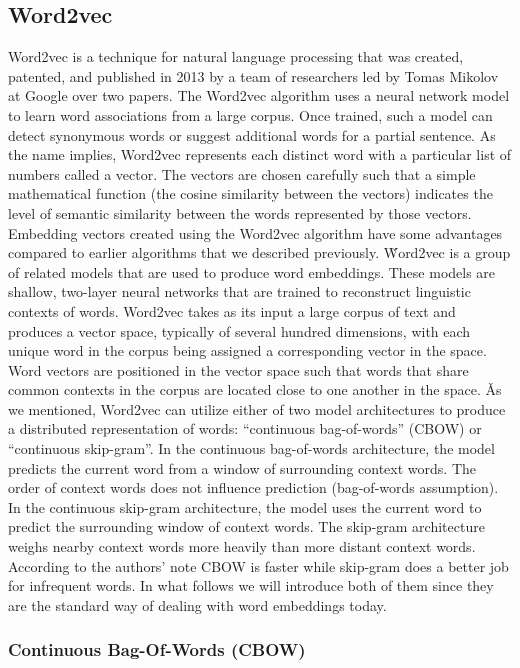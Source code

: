 \subsection{Word2vec}

Word2vec is a technique for natural language processing that was created, patented, and published in 2013 by a team
of researchers led by Tomas Mikolov at Google over two papers. The Word2vec algorithm uses a neural network model to
learn word associations from a large corpus. Once trained, such a model can detect synonymous words or suggest
additional words for a partial sentence. As the name implies, Word2vec represents each distinct word with a
particular list of numbers called a vector. The vectors are chosen carefully such that a simple mathematical function
(the cosine similarity between the vectors) indicates the level of semantic similarity between the words represented
by those vectors. Embedding vectors created using the Word2vec algorithm have some advantages compared to earlier
algorithms that we described previously. \v

Word2vec is a group of related models that are used to produce word embeddings. These models are shallow, two-layer
neural networks that are trained to reconstruct linguistic contexts of words. Word2vec takes as its input a large
corpus of text and produces a vector space, typically of several hundred dimensions, with each unique word in the
corpus being assigned a corresponding vector in the space. Word vectors are positioned in the vector space such that
words that share common contexts in the corpus are located close to one another in the space. \v

As we mentioned, Word2vec can utilize either of two model architectures to produce a distributed representation of
words: ``continuous bag-of-words'' (CBOW) or ``continuous skip-gram''. In the continuous bag-of-words architecture,
the model predicts the current word from a window of surrounding context words. The order of context words does not
influence prediction (bag-of-words assumption). In the continuous skip-gram architecture, the model uses the current
word to predict the surrounding window of context words. The skip-gram architecture weighs nearby context words more
heavily than more distant context words. According to the authors' note CBOW is faster while skip-gram does a better
job for infrequent words. In what follows we will introduce both of them since they are the standard way of dealing
with word embeddings today.

\subsubsection{Continuous Bag-Of-Words (CBOW)}

